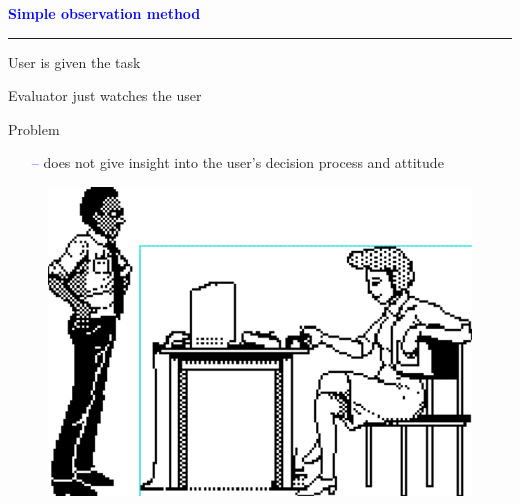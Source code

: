 \documentclass[pdf]{beamer}
\begin{document}
{%
{
\begin{frame}
	\vspace{8mm}
	\textcolor{Blue}{\textbf{\Large{Simple observation method}}}
    \textcolor{red}{\rule{10cm}{1mm}}
    User is given the task \par
    Evaluator just watches the user \par
    \bigskip
    Problem
    \begin{itemize}
    \item[\textcolor{Blue}{--}] does not give insight into the user's decision process and attitude
    \end{itemize}
    \begin{figure}[b]
    	\includegraphics[scale = 0.4, right]{16_imagine.png}
    \end{figure}
\end{frame}}

}
\end{document}

